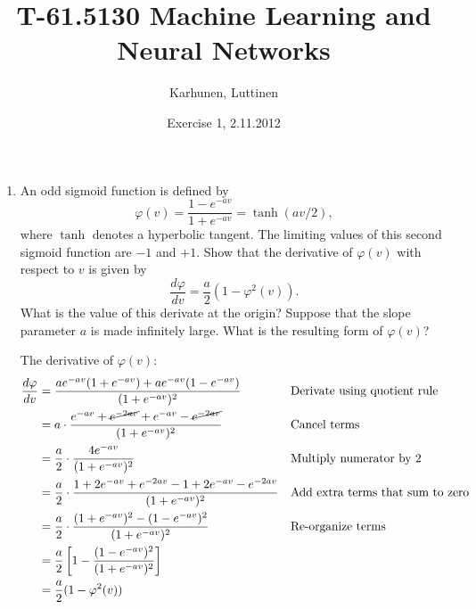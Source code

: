 
\title{T-61.5130 Machine Learning and Neural Networks}
\author{Karhunen, Luttinen}
\date{Exercise 1, 2.11.2012}

\newcommand{\vect}[1]{{\bf{#1}}}
\newcommand{\svect}[1]{\boldsymbol{#1}}
\newcommand{\matr}[1]{\boldsymbol{#1}}

\usepackage{cancel}



\maketitle

\begin{enumerate}

\item

  An odd sigmoid function is defined by
  \begin{equation}
    \label{eq:sigmoid}
    \varphi(v)=\frac{1-e^{-av}}{1+e^{-av}}=\tanh(av/2),
  \end{equation}
  where $\tanh$ denotes a hyperbolic tangent. The limiting values of
  this second sigmoid function are $-1$ and $+1$. Show that the
  derivative of $\varphi(v)$ with respect to $v$ is given by
  \begin{equation*}
    \frac{d\varphi}{dv}=\frac{a}{2}(1-\varphi^2(v)).
  \end{equation*}
  What is the value of this derivate at the origin? Suppose that the
  slope parameter $a$ is made infinitely large. What is the resulting
  form of $\varphi(v)$?  
  
  \begin{solution}

    The derivative of $\varphi(v)$:
    \begin{align*}
      \frac{d\varphi}{dv} &= \frac{a e^{-av} (1 + e^{-av}) + a
        e^{-av} (1 - e^{-av})} {(1+e^{-av})^2}
      && \text{Derivate using quotient rule}
      \\
      &= a \cdot \frac{ e^{-av} + \cancel{e^{-2av}} + e^{-av} -
        \cancel{e^{-2av}}} {(1 + e^{-av})^2}
      && \text{Cancel terms}
      \\
      &= \frac{a}{2} \cdot \frac{4 e^{-av}} {(1+e^{-av})^2} &&
      \text{Multiply numerator by 2}
      \\
      &= \frac{a}{2} \cdot \frac{1+2e^{-av}+e^{-2av} -
        1+2e^{-av}-e^{-2av}} {(1+e^{-av})^2} && \text{Add extra
        terms that sum to zero}
      \\
      &= \frac{a}{2} \cdot \frac{(1+e^{-av})^2 - (1-e^{-av})^2}
      {(1+e^{-av})^2} && \text{Re-organize terms}
      \\
      &= \frac{a}{2} \left[ 1 - \frac{(1-e^{-av})^2} {(1+e^{-av})^2}
      \right]
      \\
      &= \frac{a}{2} ( 1 - \varphi^2(v) )
    \end{align*}


\end{solution}
\end{enumerate}
